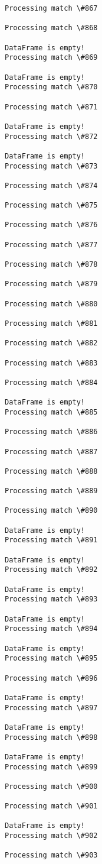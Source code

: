 \documentclass[11pt]{article}
\begin{document}
\begin{Verbatim}[commandchars=\\\{\}]
Processing match \#867

Processing match \#868

DataFrame is empty!
Processing match \#869

DataFrame is empty!
Processing match \#870

Processing match \#871

DataFrame is empty!
Processing match \#872

DataFrame is empty!
Processing match \#873

Processing match \#874

Processing match \#875

Processing match \#876

Processing match \#877

Processing match \#878

Processing match \#879

Processing match \#880

Processing match \#881

Processing match \#882

Processing match \#883

Processing match \#884

DataFrame is empty!
Processing match \#885

Processing match \#886

Processing match \#887

Processing match \#888

Processing match \#889

Processing match \#890

DataFrame is empty!
Processing match \#891

DataFrame is empty!
Processing match \#892

DataFrame is empty!
Processing match \#893

DataFrame is empty!
Processing match \#894

DataFrame is empty!
Processing match \#895

Processing match \#896

DataFrame is empty!
Processing match \#897

DataFrame is empty!
Processing match \#898

DataFrame is empty!
Processing match \#899

Processing match \#900

Processing match \#901

DataFrame is empty!
Processing match \#902

Processing match \#903


\end{Verbatim}
\end{document}
